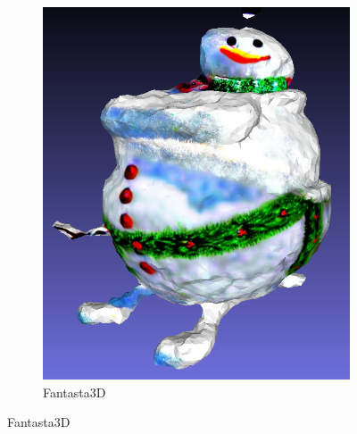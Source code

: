 \begin{figure}[ht]
\begin{subfigure}[b]{0.241\textwidth}
        \includegraphics[width=\textwidth]{figures/subjective/fantasia3d_globe_result.png}
        \caption{Fantasta3D}
        \vspace{0.1cm}
    \end{subfigure}


\end{figure}

